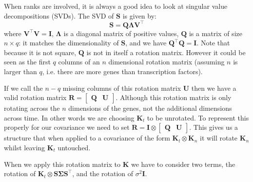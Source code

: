 When ranks are involved, it is always a good idea to look at singular value decompositions (SVDs). The SVD of $\mathbf{S}$ is given by:
\begin{equation} \label{eq:SVD}
\mathbf{S} = \mathbf{Q} \boldsymbol{\Lambda} \mathbf{V}^\top
\end{equation}
where $\mathbf{V}^\top \mathbf{V} = \mathbf{I}$, $\boldsymbol{\Lambda}$ is a diagonal matrix of positive values, $\mathbf{Q}$ is a matrix of size $n\times q$: it matches the dimensionality of $\mathbf{S}$, and we have $\mathbf{Q}^\top \mathbf{Q} = \mathbf{I}$. Note that because it is not square, $\mathbf{Q}$ is not in itself a rotation matrix. However it could be seen as the first $q$ columns of an $n$ dimensional rotation matrix (assuming $n$ is larger than $q$, i.e. there are more genes than transcription factors). 

If we call the $n-q$ missing columns of this rotation matrix $\mathbf{U}$ then we have a valid rotation matrix $\mathbf{R}=\begin{bmatrix} \mathbf{Q}& \mathbf{U}\end{bmatrix}$. Although this rotation matrix is only rotating across the $n$ dimensions of the genes, not the additional dimensions across time. In other words we are choosing $\mathbf{K}_t$ to be unrotated. To represent this properly for our covariance we need to set $\mathbf{R} = \mathbf{I} \otimes \begin{bmatrix} \mathbf{Q}& \mathbf{U}\end{bmatrix}$. This gives us a structure that when applied to a covariance of the form $\mathbf{K}_t\otimes \mathbf{K}_n$ it will rotate $\mathbf{K}_n$ whilst leaving $\mathbf{K}_t$ untouched.

When we apply this rotation matrix to $\mathbf{K}$ we have to consider two terms, the rotation of $\mathbf{K}_t \otimes \mathbf{S}\boldsymbol{\Sigma}\mathbf{S}^\top$, and the rotation of $\sigma^2 \mathbf{I}$.

